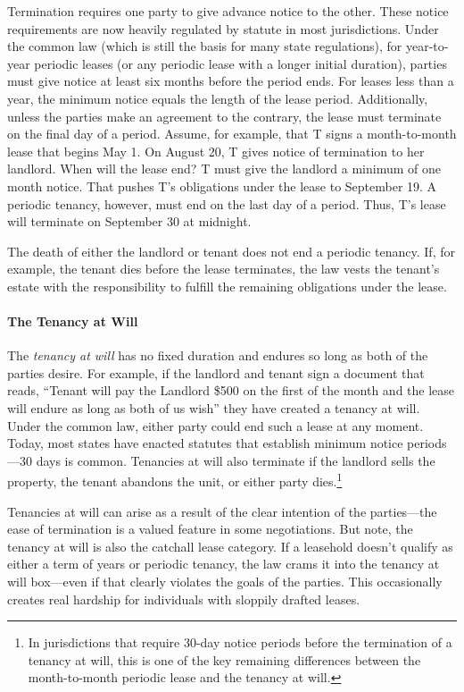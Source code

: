 Termination requires one party to give advance notice to the other.  These
notice requirements are now heavily regulated by statute in most jurisdictions.
 Under the common law (which is still the basis for many state regulations),
for year-to-year periodic leases (or any periodic lease with a longer initial
duration), parties must give notice at least six months before the period ends.
 For leases less than a year, the minimum notice equals the length of the lease
period.  Additionally, unless the parties make an agreement to the contrary,
the lease must terminate on the final day of a period.  Assume, for example,
that T signs a month-to-month lease that begins May 1.  On August 20, T gives
notice of termination to her landlord.  When will the lease end?  T must give
the landlord a minimum of one month notice.  That pushes T's obligations under
the lease to September 19.  A periodic tenancy, however, must end on the last
day of a period.  Thus, T's lease will terminate on September 30 at midnight. 

The death of either the landlord or tenant does not end a periodic tenancy.  If,
for example, the tenant dies before the lease terminates, the law vests the
tenant's estate with the responsibility to fulfill the remaining obligations
under the lease.  

\paragraph{The Tenancy at Will}

The \textit{tenancy at will} has no fixed duration and endures so long as both
of the parties desire.  For example, if the landlord and tenant sign a document
that reads, ``Tenant will pay the Landlord \$500 on the first of the month and
the lease will endure as long as both of us wish'' they have created a tenancy
at will.  Under the common law, either party could end such a lease at any
moment.  Today, most states have enacted statutes that establish minimum notice
periods---30 days is common.  Tenancies at will also terminate if the landlord
sells the property, the tenant abandons the unit, or either party
dies.\footnote{In jurisdictions that require 30-day notice periods before the
termination of a tenancy at will, this is one of the key remaining differences
between the month-to-month periodic lease and the tenancy at will.}

Tenancies at will can arise as a result of the clear intention of the
parties---the ease of termination is a valued feature in some negotiations. 
But note, the tenancy at will is also the catchall lease category.  If a
leasehold doesn't qualify as either a term of years or periodic tenancy, the
law crams it into the tenancy at will box---even if that clearly violates the
goals of the parties.  This occasionally creates real hardship for individuals
with sloppily drafted leases.  

